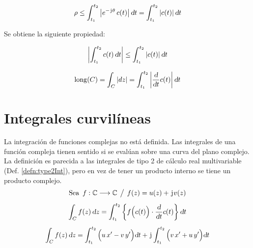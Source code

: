 \begin{equation*}
    \rho \leq \int_{t_1}^{t_2} {\left| {e^{-\mkern2mu\mathrm{j}\mkern1mu \theta} \, c(t)} \right|} \, \textsl{d} t = \int_{t_1}^{t_2} {\left| {c(t)} \right|} \, \textsl{d} t
\end{equation*}

Se obtiene la siguiente propiedad:

\begin{mdframed}[style=PropertyFrame]
    \begin{prop}
    \end{prop}
    \begin{equation*}
        {\left| {\int_{t_1}^{t_2} c(t) \, \textsl{d}t} \right|} \leq \int_{t_1}^{t_2} {\left| {c(t)} \right|} \, \textsl{d} t
    \end{equation*}
\end{mdframed}

\begin{mdframed}[style=DefinitionFrame]
    \begin{defn}
    \end{defn}
    \begin{equation*}
        \operatorname{long} (C) = \int_C {\left| {dz} \right|} = \int_{t_1}^{t_2} {\left| {\frac{\textsl{d}}{\textsl{d} t} c(t)} \right|} \, \textsl{d} t
    \end{equation*}
\end{mdframed}


\section{Integrales curvilíneas}

La integración de funciones complejas no está definida.
Las integrales de una función compleja tienen sentido si se evalúan sobre una curva del plano complejo.
La definición es parecida a las integrales de tipo 2 de cálculo real multivariable (Def. \ref{defn:type2Int}), pero en vez de tener un producto interno se tiene un producto complejo.
\begin{gather*}
    \textrm{Sea} \enspace f: \setC \longrightarrow \setC \tq f(z) = u(z) + \iu v(z)
    \\[1ex]
    \int_{C} f(z) \, \dif z = \int_{t_1}^{t_2} \left\{ f \Big( c(t) \Big) \cdot \frac{\dif}{\dif t} c(t) \right\} \dif t
    \\[1ex]
    \scale{0.98}{
    \int_{C} f(z) \, \dif z = \int_{t_1}^{t_2} \Big( u \, x' - v \, y' \Big) \dif t + \iu \int_{t_1}^{t_2} \Big( v \, x' + u \, y' \Big) \dif t
    }
\end{gather*}

